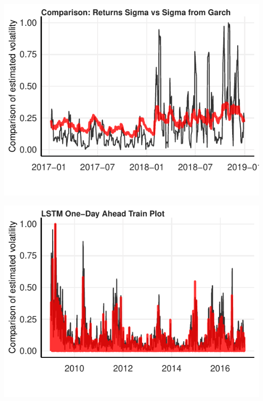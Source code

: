 \documentclass[11pt,preprint, authoryear]{elsarticle}
\let\origfigure\figure
\let\endorigfigure\endfigure
\renewenvironment{figure}[1][2] {
    \expandafter\origfigure\expandafter[H]
} {
    \endorigfigure
}
\numberwithin{equation}{section}
\numberwithin{figure}{section}
\numberwithin{table}{section}
\begin{document}
\begin{figure}[H]

{\centering \includegraphics{Essay_files/figure-latex/plot_2-1} 

}

\caption{EGARCH(1,1) One-Day Ahead Validation Forecast}\label{fig:plot_2}
\end{figure}

\begin{figure}[H]

{\centering \includegraphics{Essay_files/figure-latex/plot_3-1} 

}

\caption{LSTM One-Day Ahead Training Forecast}\label{fig:plot_3}
\end{figure}
\end{document}
